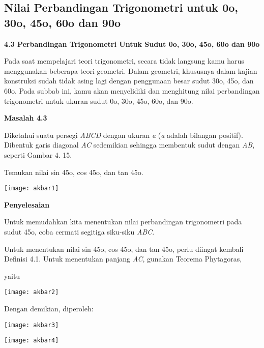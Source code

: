 \documentclass[11pt,fleqn]{book} %
\begin{document}
\begin{myEnumerate}
\begin{itemize}
\section{Nilai Perbandingan Trigonometri untuk 0o, 30o, 45o, 60o dan 90o}



\noindent \textbf{4.3 Perbandingan Trigonometri Untuk Sudut 0o, 30o, 45o, 60o dan 90o}

\noindent 

Pada saat mempelajari teori trigonometri, secara tidak langsung kamu harus menggunakan beberapa teori geometri. Dalam geometri, khususnya dalam kajian konstruksi sudah tidak asing lagi dengan penggunaan besar sudut 30o, 45o, dan 60o. Pada subbab ini, kamu akan menyelidiki dan menghitung nilai perbandingan trigonometri untuk ukuran sudut 0o, 30o, 45o, 60o, dan 90o.

\noindent \textbf{Masalah 4.3}

\noindent Diketahui suatu persegi \textit{ABCD }dengan ukuran \textit{a }(\textit{a }adalah bilangan positif). Dibentuk garis diagonal \textit{AC }sedemikian sehingga membentuk sudut dengan \textit{AB}, seperti Gambar 4. 15. 

\noindent Temukan nilai sin 45o, cos 45o, dan tan 45o.

\noindent \texttt{[image: akbar1]}

\noindent \textbf{Penyelesaian}

\noindent Untuk memudahkan kita menentukan nilai perbandingan trigonometri pada sudut 45o, coba cermati segitiga siku-siku \textit{ABC}.

\noindent Untuk menentukan nilai sin 45o, cos 45o, dan tan 45o, perlu diingat kembali Definisi 4.1. Untuk menentukan panjang \textit{AC}, gunakan Teorema Phytagoras,

\noindent yaitu

\noindent \texttt{[image: akbar2]}

\noindent 

\noindent Dengan demikian, diperoleh:

\noindent 

\noindent \texttt{[image: akbar3]}

\noindent \texttt{[image: akbar4]}


\end{itemize}
\end{myEnumerate}
\end{document}
